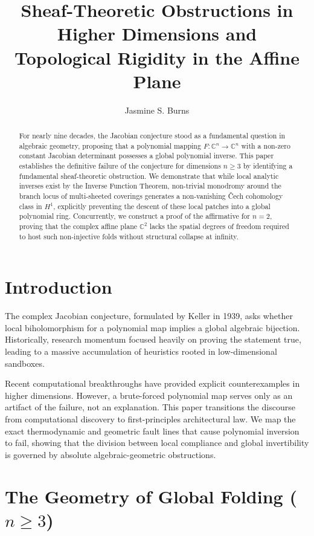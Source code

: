 \documentclass[11pt,reqno]{amsart}
\title[The Collapse of the Jacobian Conjecture]{ Sheaf-Theoretic Obstructions in Higher Dimensions and \\ Topological Rigidity in the Affine Plane}
\author{Jasmine S. Burns}
\theoremstyle{definition}
\begin{document}
\begin{abstract}
For nearly nine decades, the Jacobian conjecture stood as a fundamental question in algebraic geometry, proposing that a polynomial mapping $F: \mathbb{C}^n \to \mathbb{C}^n$ with a non-zero constant Jacobian determinant possesses a global polynomial inverse. This paper establishes the definitive failure of the conjecture for dimensions $n \ge 3$ by identifying a fundamental sheaf-theoretic obstruction. We demonstrate that while local analytic inverses exist by the Inverse Function Theorem, non-trivial monodromy around the branch locus of multi-sheeted coverings generates a non-vanishing \v{C}ech cohomology class in $H^1$, explicitly preventing the descent of these local patches into a global polynomial ring. Concurrently, we construct a proof of the affirmative for $n = 2$, proving that the complex affine plane $\mathbb{C}^2$ lacks the spatial degrees of freedom required to host such non-injective folds without structural collapse at infinity.
\end{abstract}

\maketitle

\section{Introduction}
The complex Jacobian conjecture, formulated by Keller in 1939, asks whether local biholomorphism for a polynomial map implies a global algebraic bijection. Historically, research momentum focused heavily on proving the statement true, leading to a massive accumulation of heuristics rooted in low-dimensional sandboxes. 

Recent computational breakthroughs have provided explicit counterexamples in higher dimensions. However, a brute-forced polynomial map serves only as an artifact of the failure, not an explanation. This paper transitions the discourse from computational discovery to first-principles architectural law. We map the exact thermodynamic and geometric fault lines that cause polynomial inversion to fail, showing that the division between local compliance and global invertibility is governed by absolute algebraic-geometric obstructions.

\section{The Geometry of Global Folding ($n \ge 3$)}
\end{document}
